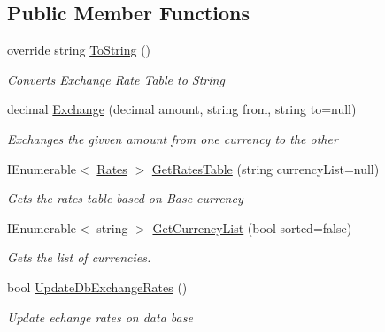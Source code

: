 \subsection*{Public Member Functions}
\begin{DoxyCompactItemize}
\item 
override string \mbox{\hyperlink{class_h_k_supply_1_1_helpers_1_1_currency_converter_1_1_currency_converter_a1a4ceafe9630b15bd2eabd7783175087}{To\+String}} ()
\begin{DoxyCompactList}\small\item\em Converts Exchange Rate Table to String \end{DoxyCompactList}\item 
decimal \mbox{\hyperlink{class_h_k_supply_1_1_helpers_1_1_currency_converter_1_1_currency_converter_af9501a149c0ed63c5cdd2faaac3b5e44}{Exchange}} (decimal amount, string from, string to=null)
\begin{DoxyCompactList}\small\item\em Exchanges the givven amount from one currency to the other \end{DoxyCompactList}\item 
I\+Enumerable$<$ \mbox{\hyperlink{struct_h_k_supply_1_1_helpers_1_1_currency_converter_1_1_rates}{Rates}} $>$ \mbox{\hyperlink{class_h_k_supply_1_1_helpers_1_1_currency_converter_1_1_currency_converter_a9b5ebe58cdabdaec1f1053574a7d792a}{Get\+Rates\+Table}} (string currency\+List=null)
\begin{DoxyCompactList}\small\item\em Gets the rates table based on Base currency \end{DoxyCompactList}\item 
I\+Enumerable$<$ string $>$ \mbox{\hyperlink{class_h_k_supply_1_1_helpers_1_1_currency_converter_1_1_currency_converter_a5aee715203b5d6854d21aae80d4aa577}{Get\+Currency\+List}} (bool sorted=false)
\begin{DoxyCompactList}\small\item\em Gets the list of currencies. \end{DoxyCompactList}\item 
bool \mbox{\hyperlink{class_h_k_supply_1_1_helpers_1_1_currency_converter_1_1_currency_converter_ab81665e2cf99100e2358d8e1e27dec35}{Update\+Db\+Exchange\+Rates}} ()
\begin{DoxyCompactList}\small\item\em Update echange rates on data base \end{DoxyCompactList}\end{DoxyCompactItemize}
